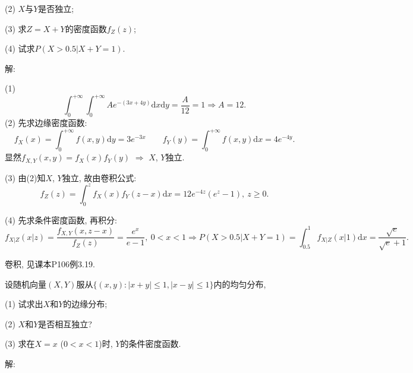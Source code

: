 \documentclass[standard]{ExBook}
\begin{document}
\begin{qitems}
\begin{bbox}
\begin{shaded}
(2) $X$与$Y$是否独立;

(3) 求$Z=X+Y$的密度函数$f_{Z}(z)$;

(4) 试求$P(X>0.5|X+Y=1)$.
    \end{shaded}
    \end{bbox}

\vspace{-5em}

    \begin{bbox}
解: 

(1)
$$\int_{0}^{+\infty}\int_{0}^{+\infty}A e^{-(3x+4y)}\mathrm{d}x\mathrm{d}y=\frac{A}{12}=1 \Longrightarrow A=12.$$
(2) 先求边缘密度函数:
$$f_{X}(x)=\int_{0}^{+\infty}f(x,y)\mathrm{d}y=3e^{-3x}\qquad f_{Y}(y)=\int_{0}^{+\infty}f(x,y)\mathrm{d}x=4e^{-4y}.$$
显然$f_{X,Y}(x,y)=f_{X}(x)f_{Y}(y)$ $\Longrightarrow$ $X$, $Y$独立.

(3) 由(2)知$X$, $Y$独立, 故由卷积公式:
$$f_{Z}(z)=\int_{0}^{z}f_{X}(x)f_{Y}(z-x)\mathrm{d}x=12e^{-4z}(e^{z}-1),\ z\geq0.$$
    \end{bbox}

\vspace{-5em}

    \begin{bbox}
(4) 先求条件密度函数, 再积分:
$$f_{X|Z}(x|z)=\frac{f_{X,Y}(x,z-x)}{f_{Z}(z)}=\frac{e^{x}}{e-1},\ 0<x<1 \Longrightarrow P(X>0.5|X+Y=1)=\int_{0.5}^{1}f_{X|Z}(x|1)\mathrm{d}x=\frac{\sqrt{e}}{\sqrt{e}+1}.$$

\textcolor{themeColor}{\selectfont {} 卷积, 见课本P106例3.19.}
    \end{bbox}

\vspace{-5em}

    \begin{bbox}
    \begin{shaded}
        \qitem
设随机向量$(X,Y)$服从$\{(x,y):|x+y|\leq1,|x-y|\leq1\}$内的均匀分布,

(1) 试求出$X$和$Y$的边缘分布;

(2) $X$和$Y$是否相互独立?

(3) 求在$X=x$ ($0<x<1$)时, $Y$的条件密度函数.
    \end{shaded}
    \end{bbox}

\vspace{-5em}

    \begin{bbox}
解: 


\end{bbox}
\end{qitems}
\end{document}
